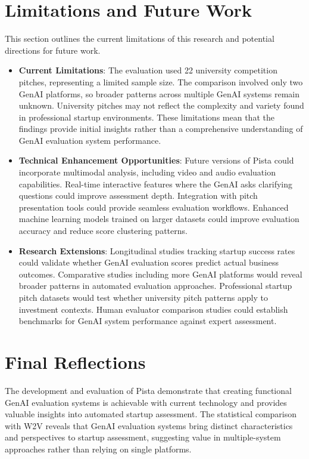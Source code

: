 \section{Limitations and Future Work}
\label{sec:limitations}

This section outlines the current limitations of this research and potential directions for future work.

\begin{itemize}
    \item \textbf{Current Limitations}: The evaluation used 22 university competition pitches, representing a limited sample size. The comparison involved only two GenAI platforms, so broader patterns across multiple GenAI systems remain unknown. University pitches may not reflect the complexity and variety found in professional startup environments. These limitations mean that the findings provide initial insights rather than a comprehensive understanding of GenAI evaluation system performance.
    \item \textbf{Technical Enhancement Opportunities}: Future versions of Pista could incorporate multimodal analysis, including video and audio evaluation capabilities. Real-time interactive features where the GenAI asks clarifying questions could improve assessment depth. Integration with pitch presentation tools could provide seamless evaluation workflows. Enhanced machine learning models trained on larger datasets could improve evaluation accuracy and reduce score clustering patterns.
    \item \textbf{Research Extensions}: Longitudinal studies tracking startup success rates could validate whether GenAI evaluation scores predict actual business outcomes. Comparative studies including more GenAI platforms would reveal broader patterns in automated evaluation approaches. Professional startup pitch datasets would test whether university pitch patterns apply to investment contexts. Human evaluator comparison studies could establish benchmarks for GenAI system performance against expert assessment.
\end{itemize}

\section{Final Reflections}
\label{sec:final-thoughts}

The development and evaluation of Pista demonstrate that creating functional GenAI evaluation systems is achievable with current technology and provides valuable insights into automated startup assessment. The statistical comparison with W2V reveals that GenAI evaluation systems bring distinct characteristics and perspectives to startup assessment, suggesting value in multiple-system approaches rather than relying on single platforms.

